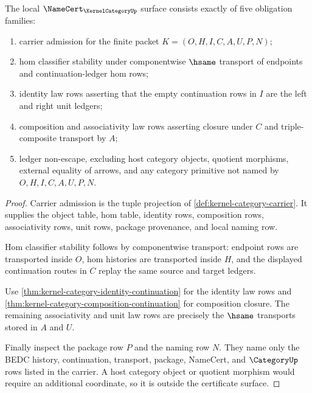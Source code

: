\begin{theorem}
\label{thm:kernel-category-certificate-surface}
The local $\NameCert_{\KernelCategoryUp}$ surface consists exactly of five obligation families:
\begin{enumerate}
\item carrier admission for the finite packet $K=(O,H,I,C,A,U,P,N)$;
\item hom classifier stability under componentwise $\hsame$ transport of endpoints and continuation-ledger hom rows;
\item identity law rows asserting that the empty continuation rows in $I$ are the left and right unit ledgers;
\item composition and associativity law rows asserting closure under $C$ and triple-composite transport by $A$;
\item ledger non-escape, excluding host category objects, quotient morphisms, external equality of arrows, and any category primitive not named by $O,H,I,C,A,U,P,N$.
\end{enumerate}
\end{theorem}
\begin{proof}
Carrier admission is the tuple projection of \autoref{def:kernel-category-carrier}. It supplies the object table, hom table, identity rows, composition rows, associativity rows, unit rows, package provenance, and local naming row.

Hom classifier stability follows by componentwise transport: endpoint rows are transported inside $O$, hom histories are transported inside $H$, and the displayed continuation routes in $C$ replay the same source and target ledgers.

Use \autoref{thm:kernel-category-identity-continuation} for the identity law rows and \autoref{thm:kernel-category-composition-continuation} for composition closure. The remaining associativity and unit law rows are precisely the $\hsame$ transports stored in $A$ and $U$.

Finally inspect the package row $P$ and the naming row $N$. They name only the BEDC history, continuation, transport, package, NameCert, and $\CategoryUp$ rows listed in the carrier. A host category object or quotient morphism would require an additional coordinate, so it is outside the certificate surface.
\end{proof}

